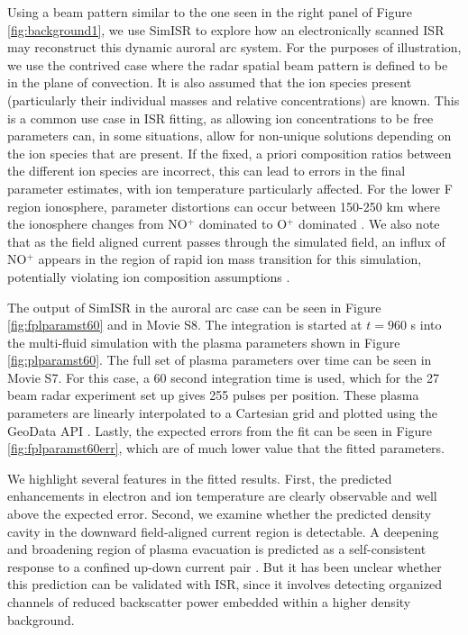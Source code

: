 \documentclass[draft,ras]{agutex}
\begin{document}
\begin{article}
Using a beam pattern similar to the one seen in the right panel of Figure \ref{fig:background1}, we use SimISR to explore how an electronically scanned ISR may reconstruct this dynamic auroral arc system.  For the purposes of illustration, we use the contrived case where the radar spatial beam pattern is defined to be in the plane of convection.  It is also assumed that the ion species present (particularly their individual masses and relative concentrations) are known. This is a common use case in ISR fitting, as allowing ion concentrations to be free parameters can, in some situations, allow for non-unique solutions depending on the ion species that are present.  If the fixed, a priori composition ratios between the different ion species are incorrect, this can lead to errors in the final parameter estimates, with ion temperature particularly affected. For the lower F region ionosphere, parameter distortions can occur between 150-250 km where the ionosphere changes from NO$^+$ dominated to O$^+$ dominated \citep{Zettergren:2011ej, Blelly:2010gf}. We also note that as the field aligned current passes through the simulated field, an influx of NO$^+$ appears in the region of rapid ion mass transition for this simulation, potentially violating ion composition assumptions \citep{Perry:2015jf}.


The output of SimISR in the auroral arc case can be seen in Figure \ref{fig:fplparamst60} and in Movie S8. The integration is started at $t=960$ s into the multi-fluid simulation with the plasma parameters shown in Figure \ref{fig:plparamst60}. The full set of plasma parameters over time can be seen in Movie S7. For this case, a 60 second integration time is used, which for the 27 beam radar experiment set up gives 255 pulses per position. These plasma parameters are linearly interpolated to a Cartesian grid and plotted using the GeoData API \citep{john_swoboda_2016_154533}. Lastly, the expected errors from the fit can be seen in Figure \ref{fig:fplparamst60err}, which are of much lower value that the fitted parameters.

We highlight several features in the fitted results. First, the predicted enhancements in electron and ion temperature are clearly observable and well above the expected error. Second, we examine whether the predicted density cavity in the downward field-aligned current region is  detectable. A deepening and broadening region of plasma evacuation is predicted as a self-consistent response to a confined up-down current pair \citep[e.g.,][]{cran;cavity}.  But it has been unclear whether this prediction can be validated with ISR, since it involves detecting organized channels of reduced backscatter power embedded within a higher density background.


\end{article}
\end{document}
